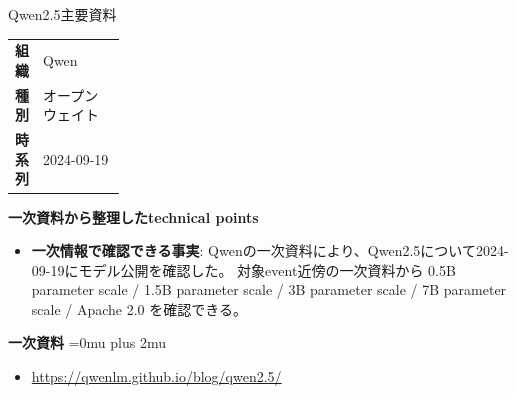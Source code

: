 \begin{technicalnote}{Qwen2.5}{主要資料}
\begingroup
\begin{tabularx}{\linewidth}{@{}>{\bfseries}p{0.22\linewidth}X@{}}
組織 & Qwen \\
種別 & オープンウェイト \\
時系列 & 2024-09-19 \\
\end{tabularx}
\smallskip
{\bfseries 一次資料から整理したtechnical points}
\begin{itemize}[leftmargin=1.5em,itemsep=0.35em]
\item \textbf{一次情報で確認できる事実}: Qwenの一次資料により、Qwen2.5について2024-09-19にモデル公開を確認した。 対象event近傍の一次資料から 0.5B parameter scale / 1.5B parameter scale / 3B parameter scale / 7B parameter scale / Apache 2.0 を確認できる。
\end{itemize}
\begin{minipage}{\linewidth}
\begin{samepage}
{\bfseries 一次資料}
\begingroup\sloppy
\Urlmuskip=0mu plus 2mu\relax
\begin{itemize}[leftmargin=1.5em,itemsep=0.25em]
\item {\scriptsize\url{https://qwenlm.github.io/blog/qwen2.5/}}
\end{itemize}
\endgroup
\end{samepage}
\end{minipage}
\endgroup
\end{technicalnote}
\medskip

